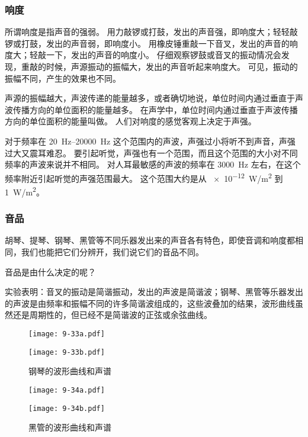 \subsubsection{响度}
所谓响度是指声音的强弱。
用力敲锣或打鼓，发出的声音强，即响度大；轻轻敲锣或打鼓，发出的声音弱，即响度小。
用橡皮锤重敲一下音叉，发出的声音的响度大；轻敲一下，发出的声音的响度小。
仔细观察锣鼓或音叉的振动情况会发现，重敲的时候，声源振动的振幅大，发出的声音听起来响度大。
可见，振动的振幅不同，产生的效果也不同。

声源的振幅越大，声波传递的能量越多，或者确切地说，单位时间内通过垂直于声波传播方向的单位面积的能量越多。
在声学中，单位时间内通过垂直于声波传播方向的单位面积的能量叫做。
人们对响度的感觉客观上决定于声强。

对于频率在 \qtyrange{20}{20000}{Hz} 这个范围内的声波，声强过小将听不到声音，声强过大又震耳难忍。
要引起听觉，声强也有一个范围，而且这个范围的大小对不同频率的声波来说并不相同。
对人耳最敏感的声波的频率在 \qty{3000}{Hz} 左右，在这个频率附近引起听觉的声强范围最大。
这个范围大约是从 \qty{e-12}{W/m^2} 到 \qty{1}{W/m^2}。

\subsubsection{音品}

胡琴、提琴、钢琴、黑管等不同乐器发出来的声音各有特色，即使音调和响度都相同，我们也能把它们分辨开，我们说它们的音品不同。

音品是由什么决定的呢？

实验表明：音叉的振动是简谐振动，发出的声波是简谐波；钢琴、黑管等乐器发出的声波是由频率和振幅不同的许多简谐波组成的，这些波叠加的结果，波形曲线虽然还是周期性的，但已经不是简谐波的正弦或余弦曲线。
\begin{figure}
  \begin{minipage}[b]{0.48\linewidth}
    \begin{minipage}{\linewidth}\centering
      \texttt{[image: 9-33a.pdf]}
      \subcaption{}\label{fig:9-33a}
    \end{minipage}
    \begin{minipage}{\linewidth}\centering
      \texttt{[image: 9-33b.pdf]}
      \subcaption{}\label{fig:9-33b}
    \end{minipage}
    \caption{钢琴的波形曲线和声谱}\label{fig:9-33}
  \end{minipage}
  \begin{minipage}[b]{0.48\linewidth}
    \begin{minipage}{\linewidth}\centering
      \texttt{[image: 9-34a.pdf]}
      \subcaption{}\label{fig:9-34a}
    \end{minipage}
    \begin{minipage}{\linewidth}\centering
      \texttt{[image: 9-34b.pdf]}
      \subcaption{}\label{fig:9-34b}
    \end{minipage}
    \caption{黑管的波形曲线和声谱}\label{fig:9-34}
  \end{minipage}
\end{figure}

